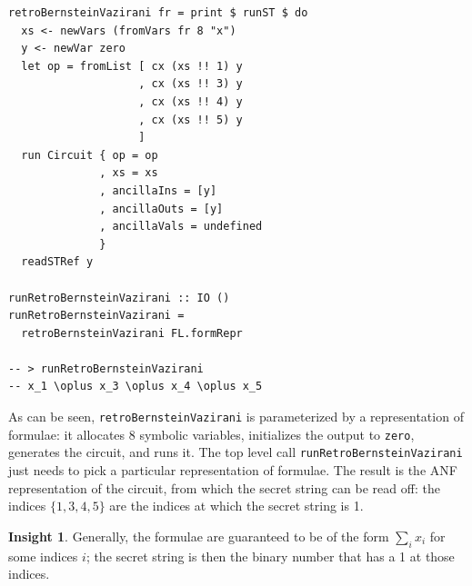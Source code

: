 \documentclass[sigplan,screen]{acmart}
\newcommand{\h}[1]{\texttt{#1}}
\theoremstyle{definition}
\newtheorem*{insight}{Insight}
\begin{document}
\begin{verbatim}
retroBernsteinVazirani fr = print $ runST $ do                                    
  xs <- newVars (fromVars fr 8 "x")                                               
  y <- newVar zero                                                                
  let op = fromList [ cx (xs !! 1) y                                              
                    , cx (xs !! 3) y                                              
                    , cx (xs !! 4) y                                              
                    , cx (xs !! 5) y                                              
                    ]                                                             
  run Circuit { op = op                                                           
              , xs = xs                                                           
              , ancillaIns = [y]                                                  
              , ancillaOuts = [y]                                                 
              , ancillaVals = undefined                                           
              }                                                                   
  readSTRef y                                                                     
                                                                                  
runRetroBernsteinVazirani :: IO ()                                                
runRetroBernsteinVazirani = 
  retroBernsteinVazirani FL.formRepr                    
                            
-- > runRetroBernsteinVazirani 
-- x_1 \oplus x_3 \oplus x_4 \oplus x_5
\end{verbatim}
As can be seen, \h{retroBernsteinVazirani} is parameterized by a
representation of formulae: it allocates 8 symbolic variables,
initializes the output to \h{zero}, generates the circuit, and runs
it. The top level call \h{runRetroBernsteinVazirani} just needs to
pick a particular representation of formulae. The result is the ANF
representation of the circuit, from which the secret string can be
read off: the indices $\{1,3,4,5\}$ are the indices at which the secret
string is 1.

\begin{insight}
  Generally, the formulae are guaranteed to be of the form
  $\sum_i x_i$ for some indices $i$; the secret string is then the
  binary number that has a 1 at those indices.
\end{insight}
\end{document}
